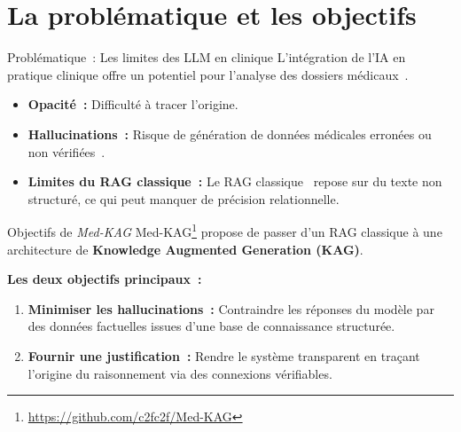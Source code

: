 \section{La problématique et les objectifs}

\begin{frame}{Problématique~: Les limites des LLM en clinique}
  L'intégration de l'IA en pratique clinique offre un potentiel pour l'analyse
  des dossiers médicaux~\cite{ALGHAMDI2025102528,
  zhou2024surveylargelanguagemodels}.

  \medskip{}

  \begin{itemize}
    \item<2-> \textbf{Opacité~:} Difficulté à tracer l'origine.
    \item<3-> \textbf{Hallucinations~:} Risque de génération de données
      médicales erronées ou non vérifiées~\cite{10.1145/3703155}.
    \item<4-> \textbf{Limites du RAG classique~:} Le RAG
      classique~\cite{gao2024modularragtransformingrag} repose sur du texte
      non structuré, ce qui peut manquer de précision relationnelle.
  \end{itemize}
\end{frame}

\begin{frame}{Objectifs de \emph{Med-KAG}}
  Med-KAG\footnote{\url{https://github.com/c2fc2f/Med-KAG}} propose de passer
  d'un RAG classique à une architecture de \textbf{Knowledge Augmented
  Generation (KAG)}.

  \medskip{}

  \pause[]

  \textbf{Les deux objectifs principaux~:}
  \begin{enumerate}
    \item<2-> \textbf{Minimiser les hallucinations~:} Contraindre les réponses
      du modèle par des données factuelles issues d'une base de connaissance
      structurée.
    \item<3-> \textbf{Fournir une justification~:} Rendre le système
      transparent en traçant l'origine du raisonnement via des connexions
      vérifiables.
  \end{enumerate}
\end{frame}

